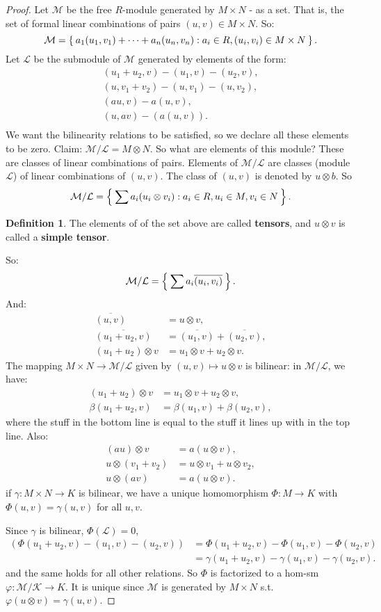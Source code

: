 \documentclass[12pt]{amsbook}
\theoremstyle{plain}
\numberwithin{section}{chapter}
\numberwithin{equation}{chapter}
\theoremstyle{definition}
\newtheorem{Def}[theorem]{Definition}
\theoremstyle{remark}
\newcommand{\bee}{\begin{equation}\begin{aligned}}
\newcommand{\eee}{\end{aligned}\end{equation}}
\newcommand{\ten}{\otimes} %
\renewcommand{\phi}{\varphi}
\begin{document}
 
 \begin{proof}
 Let $\mathcal{M}$ be the free $R$-module generated by $M \times N$ - as a set. That is, the set of formal linear combinations of pairs $(u,v) \in M \times N$. So:
 $$
 \mathcal{M} = \Set{a_1(u_1,v_1) + \cdots + a_n(u_n,v_n):a_i \in R, (u_i,v_i) \in M \times N}.
 $$
 Let $\mathcal{L}$ be the submodule of $\mathcal{M}$ generated by elements of the form: 
 \bee
 (u_1 + u_2,v) - (u_1,v) - (u_2,v),\\(u,v_1 + v_2) - (u,v_1) - (u,v_2),\\
 (au,v) - a(u,v),\\
 (u,av) - (a(u,v)).\\
 \eee
 We want the bilinearity relations to be satisfied, so we declare all these elements to be zero. 
 Claim: $\mathcal{M}/\mathcal{L} = M \otimes N$. So what are elements of this module? These are classes of linear combinations of pairs. Elements of $\mathcal{M}/\mathcal{L}$ are classes (module $\mathcal{L}$) of linear combinations of $(u,v)$. The class of $(u,v)$ is denoted by $u \otimes b$. So 
 $$
 \mathcal{M}/\mathcal{L} = \Set{\sum a_i(u_i \otimes v_i): a_i \in R, u_i \in M,v_i \in N}.
 $$
 
 \begin{Def}The elements of of the set above are called \textbf{tensors}, and $u \otimes v$ is called a \textbf{simple tensor}. 
 \end{Def}
 So:
  $$
 \mathcal{M}/\mathcal{L} = \Set{\sum a_i\overline{(u_i,v_i)}}.
 $$
 And:
 \bee
 \overline{(u,v)} &= u \otimes v,\\
 \overline{(u_1 + u_2,v)} &= \overline{(u_1,v)} + \overline{(u_2,v)},\\
 (u_1 + u_2) \otimes v &= u_1 \otimes v + u_2 \otimes v.
 \eee
 The mapping $M \times N \to \mathcal{M}/\mathcal{L}$ given by $(u,v) \mapsto u \otimes v$ is bilinear: in $\mathcal{M}/\mathcal{L}$, we have:
 \bee
 (u_1 + u_2) \otimes v &= u_1 \otimes v + u_2 \otimes v,\\
 \beta(u_1 + u_2,v) &= \beta(u_1,v) + \beta(u_2,v),
 \eee
 where the stuff in the bottom line is equal to the stuff it lines up with in the top line. Also: 
 \bee
 (au) \otimes v &= a(u \otimes v),\\
 u \otimes (v_1 + v_2) &= u\otimes v_1 
+ u\otimes v_2,\\
u\otimes (av) &= a(u \otimes v).
\eee
if $\gamma:M \times N \to K$ is bilinear, we have a unique homomorphism $\Phi: M \to K$ with $\Phi(u,v) = \gamma(u,v)$ for all $u,v$. 

Since $\gamma$ is bilinear, $\Phi(\mathcal{L}) = 0$,
\bee
(\Phi(u_1 + u_2,v) - (u_1,v) - (u_2,v)) 
&= \Phi(u_1 + u_2,v) - \Phi(u_1,v) - \Phi(u_2,v)\\
&= \gamma(u_1 + u_2,v) - \gamma(u_1,v) - \gamma(u_2,v).
\eee
and the same holds for all other relations. So $\Phi$ is factorized to a hom-sm $\phi: \mathcal{M}/\mathcal{K} \to K$. It is unique since $\mathcal{M}$ is generated by $M \times N$ s.t. $\phi(u \ten v) = \gamma(u,v)$. 
 \end{proof}
 
\end{document}

